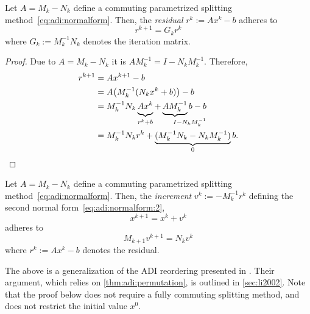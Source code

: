 \begin{proposition}
\label{thm:adi:residual}
  Let $A = M_k - N_k$ define a commuting parametrized splitting method~\eqref{eq:adi:normalform}.
  Then, the \emph{residual} $r^k := Ax^k - b$ adheres to
  \begin{equation*}
    r^{k+1} = G_k r^k
  \end{equation*}
  where $G_k := M_k^{-1} N_k$ denotes the iteration matrix.
\end{proposition}
\begin{proof}
  Due to $A = M_k - N_k$ it is $AM_k^{-1} = I - N_k M_k^{-1}$.
  Therefore,
  \begin{align*}
    r^{k+1}
    &= Ax^{k+1} - b \\
    &= A \big( M_k^{-1} (N_k x^k + b) \big) - b \\
    &= M_k^{-1} N_k \underbrace{
      \vphantom{M_k^{-1}}
      Ax^k
    }_{
      \vphantom{M_k^{-1}}
      r^k + b
    }
    + \underbrace{
      A M_k^{-1}
    }_{
      I\mathrlap{{} - N_k M_k^{-1}}
    } b - b \\
    &= M_k^{-1} N_k r^k + \underbrace{
      (M_k^{-1} N_k - N_k M_k^{-1})
    }_0 b
    .
  \end{align*}
\end{proof}

\begin{corollary}
\label{thm:adi:increment-form}
  Let $A = M_k - N_k$ define a commuting parametrized splitting method~\eqref{eq:adi:normalform}.
  Then, the \emph{increment} $v^k := - M_k^{-1} r^k$ defining the second normal form~\eqref{eq:adi:normalform:2},
  \begin{equation*}
    x^{k+1} = x^k + v^k
  \end{equation*}
  adheres to
  \begin{equation*}
    M_{k+1} v^{k+1} = N_k v^k
  \end{equation*}
  where $r^k := Ax^k - b$ denotes the residual.
\end{corollary}

\begin{remark}
  The above is a generalization of the \ac{ADI} reordering presented in \cite[Section~4]{Li2002}.
  Their argument,
  which relies on \autoref{thm:adi:permutation},
  is outlined in \autoref{sec:li2002}.
  Note that the proof below does not require a fully commuting splitting method,
  and does not restrict the initial value $x^0$.
\end{remark}

